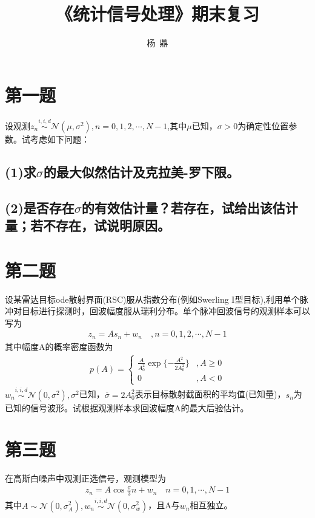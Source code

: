 \documentclass[fontset=windows]{article}
\title{\heiti\zihao{2} 《统计信号处理》期末复习}
\author{杨\ 鼎}
\date{}
\numberwithin{figure}{section}
\begin{document}
\maketitle
\thispagestyle{empty}


\tableofcontents
\setcounter{page}{0}
\newpage

\section{第一题}
设观测\(z_n\overset{i,i,d}{\sim} \mathcal{N} (\mu, \sigma^2),n=0,1,2,\cdots,N-1\),其中\(\mu\)已知，\(\sigma>0\)为确定性位置参数。试考虑如下问题：

\subsection*{(1)求\(\sigma\)的最大似然估计及克拉美-罗下限。}

\subsection*{(2)是否存在\(\sigma\)的有效估计量？若存在，试给出该估计量；若不存在，试说明原因。}

\section{第二题}
设某雷达目标ode散射界面(RSC)服从指数分布(例如Swerling I型目标),利用单个脉冲对目标进行探测时，回波幅度服从瑞利分布。单个脉冲回波信号的观测样本可以写为
\begin{align*}
	z_n=As_n+w_n\quad ,n=0,1,2,\cdots, N-1
\end{align*}
其中幅度A的概率密度函数为
\begin{align*}
	p(A)=\left\{
	\begin{matrix}
		\frac{A}{A_0^2} \exp\{-\frac{A^2}{2A^2_0} \} & ,A \geq 0 \\
		0                                            & ,A<0
	\end{matrix}
	\right.
\end{align*}
\(w_n\overset{i,i,d}{\sim}\mathcal{N}(0,\sigma^2),\sigma^2\)已知，\(\overline{\sigma}=2A^2_0\)表示目标散射截面积的平均值(已知量)，\(s_n\)为已知的信号波形。试根据观测样本求回波幅度A的最大后验估计。


\section{第三题}
在高斯白噪声中观测正选信号，观测模型为
\begin{align*}
	z_n=A\cos\frac{\pi}{3}n+w_n\quad n=0,1,\cdots,N-1
\end{align*}
其中\(A\sim \mathcal{N}(0,\sigma^2_A),w_n\overset{i,i,d}{\sim}\mathcal{N}(0,\sigma^2_w)\)，且A与\(w_n\)相互独立。
\end{document}
